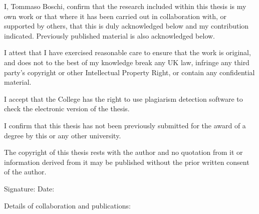 \clearpage

I, Tommaso Boschi, confirm that the research included within this thesis %
is my own work or that where it has been carried out in collaboration with, %
or supported by others, that this is duly acknowledged below and my contribution indicated.
Previously published material is also acknowledged below.

\noindent
I attest that I have exercised reasonable care to ensure that the work is original, %
and does not to the best of my knowledge break any UK law, infringe any third party’s copyright %
or other Intellectual Property Right, or contain any confidential material.

\noindent
I accept that the College has the right to use plagiarism detection %
software to check the electronic version of the thesis.

\noindent
I confirm that this thesis has not been previously submitted %
for the award of a degree by this or any other university.

\noindent
The copyright of this thesis rests with the author and no quotation from it %
or information derived from it may be published without the prior written consent of the author.

Signature: 
Date:

Details of collaboration and publications:
